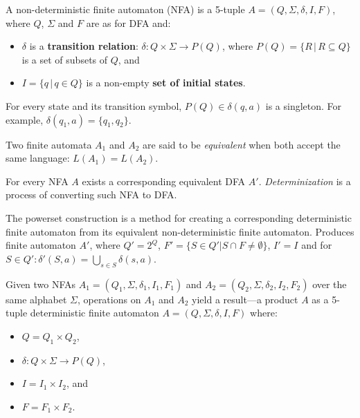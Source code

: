 \begin{definition} \hfill \newline
    A non-deterministic finite automaton (NFA) is a 5-tuple $A = (Q, \Sigma, \delta, I, F)$, where $Q$, $\Sigma$ and $F$ are as for DFA and:
    \begin{itemize}
        \item $\delta$ is a \textbf{transition relation}: $\delta: Q \times \Sigma \rightarrow{} P(Q)$, where $P(Q) = \{R \,\vert\, R \subseteq Q\}$ is a set of subsets of $Q$, and
        \item $I = \{q \,\vert\, q \in Q\}$ is a non-empty \textbf{set of initial states}.
    \end{itemize}
\end{definition}

For every state and its transition symbol, $P(Q) \in \delta(q, a)$ is a singleton. For example, $\delta(q_1, a) = \{ q_1, q_2 \}$.

Two finite automata $A_1$ and $A_2$ are said to be \emph{equivalent} when both accept the same language: $L(A_1) = L(A_2)$.

For every NFA $A$ exists a corresponding equivalent DFA $A'$. \emph{Determinization} is a process of converting such NFA to DFA.

\begin{definition} \hfill \newline
    The powerset construction is a method for creating a corresponding deterministic finite automaton from its equivalent non-deterministic finite automaton. Produces finite automaton $A'$, where $Q' = 2^Q$, $F' = \{S \in Q' | S \cap F \neq \emptyset\}$, $I' = I$ and for $S \in Q': \delta'(S, a) = \bigcup_{s \in S} \delta(s, a)$.
\end{definition}

\begin{definition} \hfill \newline
Given two NFAs $A_1 = (Q_1, \Sigma, \delta_1, I_1, F_1)$ and $A_2 = (Q_2, \Sigma, \delta_2, I_2, F_2)$ over the same alphabet $\Sigma$, operations on $A_1$ and $A_2$ yield a result---a product $A$ as a 5-tuple deterministic finite automaton $A = (Q, \Sigma, \delta, I, F)$ where:
\begin{itemize}
    \item $Q = Q_1 \times Q_2$,
    \item $\delta: Q \times \Sigma \rightarrow{} P(Q)$,
    \item $I = I_1 \times I_2$, and
    \item $F = F_1 \times F_2$.
\end{itemize}
\end{definition}

